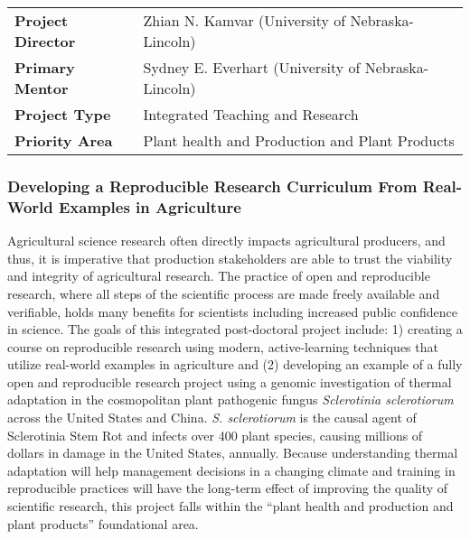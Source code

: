 \documentclass[12pt,letterpaper]{article}
\title{\ruleline{Project Summary}}
\begin{document}
\maketitle

\vspace{2em}

\begin{centering}
\begin{tabular}{ll}
\textbf{Project Director} & Zhian N. Kamvar (University of Nebraska-Lincoln)\\
\textbf{Primary Mentor  } & Sydney E. Everhart (University of Nebraska-Lincoln)\\
\textbf{Project Type    } & Integrated Teaching and Research\\
\textbf{Priority Area   } & Plant health and Production and Plant Products
\end{tabular}
\end{centering}

\vspace{2em}

\subsubsection*{Developing a Reproducible Research Curriculum From Real-World Examples in Agriculture}

Agricultural science research often directly impacts agricultural producers, and thus, it is imperative that production stakeholders are able to trust the viability and integrity of agricultural research. 
The practice of open and reproducible research, where all steps of the scientific process are made freely available and verifiable, holds many benefits for scientists including increased public confidence in science. 
The goals of this integrated post-doctoral project include: 1) creating a course on reproducible research using modern, active-learning techniques that utilize real-world examples in agriculture and (2) developing an example of a fully open and reproducible research project using a genomic investigation of thermal adaptation in the cosmopolitan plant pathogenic fungus \textit{Sclerotinia sclerotiorum} across the United States and China. 
\textit{S. sclerotiorum} is the causal agent of Sclerotinia Stem Rot and infects over 400 plant species, causing millions of dollars in damage in the United States, annually. 
Because understanding thermal adaptation will help management decisions in a changing climate and training in reproducible practices will have the long-term effect of improving the quality of scientific research, this project falls within the ``plant health and production and plant products'' foundational area. 
\end{document}
